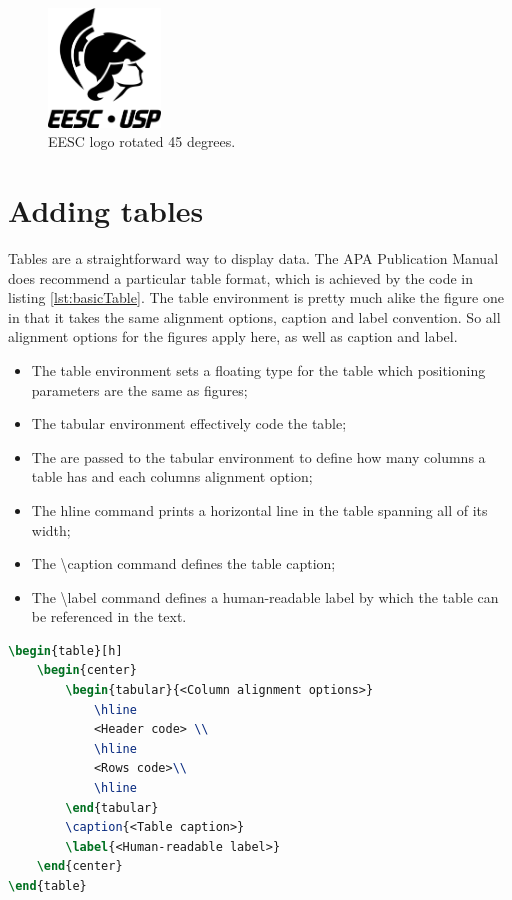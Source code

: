 \begin{figure}[h]
	\centering
	\includegraphics[width = 3cm, angle = 45]{../images/uniLogo.pdf}
	\caption{EESC logo rotated 45 degrees.}
	\label{fig:45degreeEESC}
\end{figure}

	\section{Adding tables}

	Tables are a straightforward way to display data. The APA Publication Manual does recommend a particular table format, which is achieved by the code in listing \ref{lst:basicTable}. The {\ttfamily table} environment is pretty much alike the figure one in that it takes the same alignment options, caption and label convention. So all alignment options for the figures apply here, as well as caption and label.

\begin{itemize}
	\item The {\ttfamily table} environment sets a floating type for the table which positioning parameters are the same as figures;
	\item The {\ttfamily tabular} environment effectively code the table;
	\item The {\ttfamily <Column alignment options>} are passed to the tabular environment to define how many columns a table has and each columns alignment option;
	\item The {\ttfamily hline} command prints a horizontal line in the table spanning all of its width;
	\item The {\ttfamily \textbackslash caption} command defines the table caption;
	\item The {\ttfamily \textbackslash label} command defines a human-readable label by which the table can be referenced in the text.
\end{itemize}

\begin{lstlisting}[caption = {Basic table code}, label = {lst:basicTable}, style = prettyListing, language = tex]
\begin{table}[h]
	\begin{center}
		\begin{tabular}{<Column alignment options>}
			\hline
			<Header code> \\
			\hline
			<Rows code>\\
			\hline
		\end{tabular}
		\caption{<Table caption>}
		\label{<Human-readable label>}
	\end{center}
\end{table}
\end{lstlisting}

